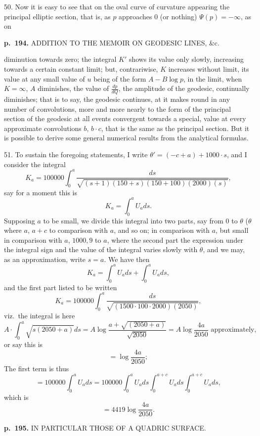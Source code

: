 \documentclass[11pt,a4paper]{book}
\begin{document}
50. Now it is easy to see that on the oval curve of curvature appearing the principal elliptic section, that is, as $p$ approaches $0$ (or nothing) $\Psi(p) = -\infty$, as on

\clearpage

\noindent
\textbf{p.~194.}  ADDITION TO THE MEMOIR ON GEODESIC LINES, \&c.

diminution towards zero; the integral $K'$ shows its value only slowly, increasing towards a certain constant limit; but, contrariwise, $K$ increases without limit, its value at any small value of $u$ being of the form $A - B \log p$, in the limit, when $K = \infty$, $A$ diminishes, the value of $\frac{dp}{dQ}$, the amplitude of the geodesic, continually diminishes; that is to say, the geodesic continues, at it makes round in any number of convolutions, more and more nearly to the form of the principal section of the geodesic at all events convergent towards a special, value at every approximate convolutions $b$, $b \cdot c$, that is the same as the principal section. But it is possible to derive some general numerical results from the analytical formulas.

51. To sustain the foregoing statements, I write $\theta' = (-c + a) + 1000 \cdot s$, and I consider the integral
\[
K_a = 100000 \int_0^a \frac{ds}{\sqrt{(s + 1)(150 + s)(150 + 100)(2000)(s)}},
\]
say for a moment this is
\[
K_a = \int_0^a U_a ds.
\]
Supposing $a$ to be small, we divide this integral into two parts, say from $0$ to $\theta$ ($\theta$ where $a$, $a + c$ to comparison with $a$, and so on; in comparison with $a$, but small in comparison with $a$, $1000, 9$ to $a$, where the second part the expression under the integral sign and the value of the integral varies slowly with $\theta$, and we may, as an approximation, write $s = a$. We have then
\[
K_a = \int_0^{a} U_a ds + \int_0^{a} U_a ds,
\]
and the first part listed to be written
\[
K_a = 100000 \int_0^{a} \frac{ds}{\sqrt{(1500 \cdot 100 \cdot 2000)(2050)}},
\]
viz.\ the integral is here
\[
A \cdot \int_0^a \sqrt{s(2050 + a)} ds = A \log \frac{a + \sqrt{(2050 + a)}}{\sqrt{2050}} = A \log \frac{4a}{2050} \text{ approximately},
\]
or say this is
\[
= \log \frac{4a}{2050};
\]
The first term is thus
\[
= 100000 \int_0^{a} U_a ds = 100000 \int_0^a U_a ds \int_0^{a + c} U_a ds \int_0^{a + c} U_a ds,
\]
which is
\[
= 4419 \log \frac{4a}{2050}.
\]

\clearpage

\noindent
\textbf{p.~195.}  IN PARTICULAR THOSE OF A QUADRIC SURFACE.
\end{document}
